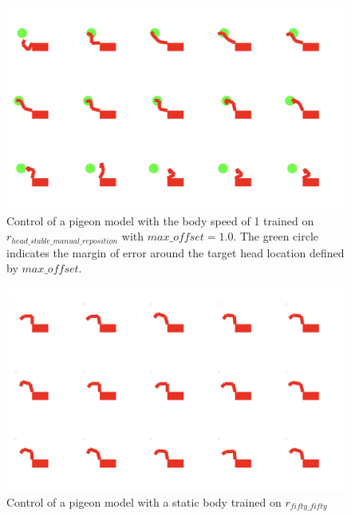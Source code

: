   \begin{figure}[H]
      \centering
      \includegraphics[width=1\textwidth]{figures/frames/frames_003.png}
      \caption{Control of a pigeon model with the body speed of 1 trained on $r_{head\_stable\_manual\_reposition}$ with $max\_offset = 1.0$. The green circle indicates the margin of error around the target head location defined by $max\_offset$.}
      \label{fig:manual_trajectory_not_strict_body_speed_1}
  \end{figure}

  \begin{figure}[H]
      \centering
      \includegraphics[width=1\textwidth]{figures/frames/frames_004.png}
      \caption{Control of a pigeon model with a static body trained on $r_{fifty\_fifty}$}
      \label{fig:fifty_fifty_body_speed_0}
  \end{figure}

